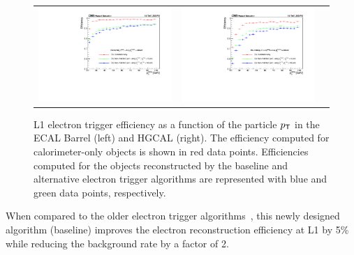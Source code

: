  \begin{figure}[tbh!]
 \begin{center}
 \begin{tabular}{ccc}
  \includegraphics[width=.45\linewidth]{figures/Part2/Upgrade/eff_barrel}&
  \includegraphics[width=.45\linewidth]{figures/Part2/Upgrade/eff_endcap}&
 \end{tabular}
 \caption{\ac{L1} electron trigger efficiency as a function of the particle $p_{\textsf{T}}$ in the \ac{ECAL} Barrel (left) and \ac{HGCAL} (right). The efficiency computed for calorimeter-only objects is shown in red data points. Efficiencies computed for the objects reconstructed by the baseline and alternative electron trigger algorithms are represented with blue and green data points, respectively.}
 \label{fig:eff_electron}
 \end{center}
\end{figure}

When compared to the older electron trigger algorithms~\cite{CMS:2017lum}, this newly designed algorithm (baseline) improves the electron reconstruction efficiency at \ac{L1} by 5\% while reducing the background rate by a factor of 2.  